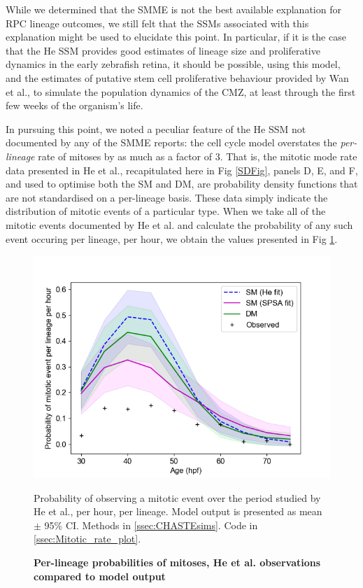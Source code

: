 \documentclass{ut-thesis}
\begin{document}
\begin{NoHyper}
While we determined that the SMME is not the best available explanation for RPC lineage outcomes, we still felt that the SSMs associated with this explanation might be used to elucidate this point. In particular, if it is the case that the He SSM provides good estimates of lineage size and proliferative dynamics in the early zebrafish retina, it should be possible, using this model, and the estimates of putative stem cell proliferative behaviour provided by Wan et al., to simulate the population dynamics of the CMZ, at least through the first few weeks of the organism's life.

In pursuing this point, we noted a peculiar feature of the He SSM not documented by any of the SMME reports: the cell cycle model overstates the  \textit{per-lineage} rate of mitoses by as much as a factor of 3. That is, the mitotic mode rate data presented in He et al., recapitulated here in Fig \ref{SDFig}, panels D, E, and F, and used to optimise both the SM and DM, are probability density functions that are not standardised on a per-lineage basis. These data simply indicate the distribution of mitotic events of a particular type. When we take all of the mitotic events documented by He et al. and calculate the probability of any such event occuring per lineage, per hour, we obtain the values presented in Fig \ref{PerLineageFig}.

\begin{figure}[!h]
\includegraphics{ssm/Fig_6_per_lineage_mitotic_rate.png}
\caption{{\bf Per-lineage probabilities of mitoses, He et al. observations compared to model output}}
Probability of observing a mitotic event over the period studied by He et al., per hour, per lineage. Model output is presented as mean $\pm$ 95\% CI.
Methods in \autoref{ssec:CHASTEsims}.
Code in \autoref{ssec:Mitotic_rate_plot}.
\label{PerLineageFig}
\end{figure}


\end{NoHyper}
\end{document}
